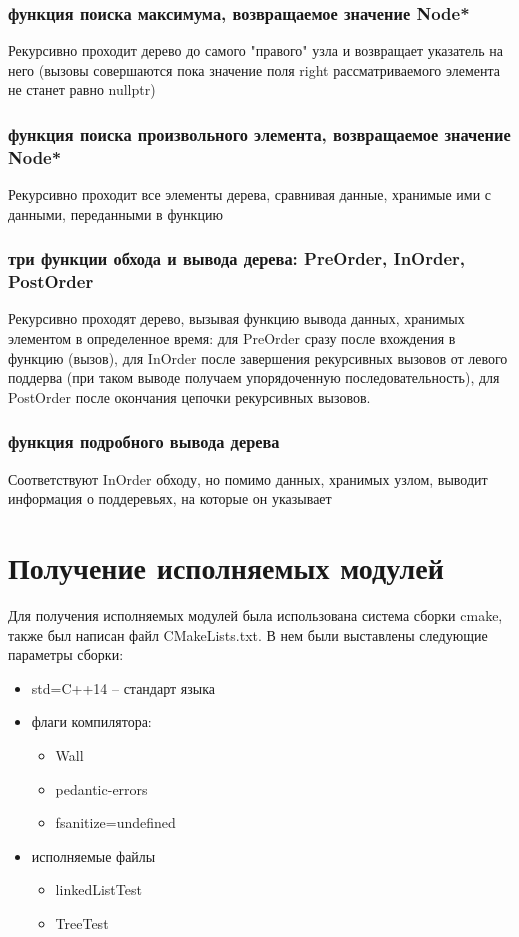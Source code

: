 \documentclass[a4paper,12pt]{article}
\begin{document}
\begin{enumerate}
      \subsubsection{функция поиска максимума, возвращаемое значение Node*}
      Рекурсивно проходит дерево до самого "правого" узла и возвращает указатель на него (вызовы совершаются пока значение поля right рассматриваемого элемента не станет равно nullptr)
      
      \subsubsection{функция поиска произвольного элемента, возвращаемое значение Node*}
      Рекурсивно проходит все элементы дерева, сравнивая данные, хранимые ими с данными, переданными в функцию
      
      \subsubsection{три функции обхода и вывода дерева: PreOrder, InOrder, PostOrder}
      Рекурсивно проходят дерево, вызывая функцию вывода данных, хранимых элементом в определенное время: для PreOrder сразу после вхождения в функцию (вызов), для InOrder после завершения рекурсивных вызовов от левого поддерва (при таком выводе получаем упорядоченную последовательность), для PostOrder после окончания цепочки рекурсивных вызовов. 
      
      \subsubsection{функция подробного вывода дерева}
      Соответствуют InOrder обходу, но помимо данных, хранимых узлом, выводит информация о поддеревьях, на которые он указывает
      
  \end{enumerate}

\section{Получение исполняемых модулей}
Для получения исполняемых модулей была использована система сборки cmake, также был написан файл CMakeLists.txt. В нем были выставлены следующие параметры сборки:
\begin{itemize}
  \item std=C++14 – стандарт языка
  \item флаги компилятора:
     \begin{itemize}
     \item Wall
     \item pedantic-errors
     \item fsanitize=undefined
     \end{itemize} 
   \item исполняемые файлы
     \begin{itemize}
       \item linkedListTest
       \item TreeTest
     \end{itemize} 
\end{itemize} 
\end{document}
